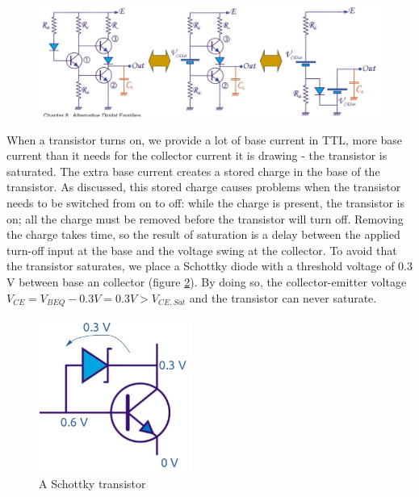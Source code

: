 \begin{figure}[h!]
	\centering
	\includegraphics[width=16cm]{figures/ch15/totem_low.jpg}
	\caption{}
	\label{fig:totem_low}
\end{figure}

When a transistor turns on, we provide a lot of base current in TTL, more base current than it needs for the collector current it is drawing - the transistor is saturated. The extra base current creates a stored charge in the base of the transistor. As discussed, this stored charge causes problems when the transistor needs to be switched from on to off: while the charge is present, the transistor is on; all the charge must be removed before the transistor will turn off. Removing the charge takes time, so the result of saturation is a delay between the applied turn-off input at the base and the voltage swing at the collector. To avoid that the transistor saturates, we place a Schottky diode with a threshold voltage of $0.3$ V between base an collector (figure \ref{fig:schottky_transistor}). By doing so, the collector-emitter voltage $V_{CE} = V_{BEQ} - 0.3V = 0.3V  > V_{CE, Sat}$ and the transistor can never saturate. 

\begin{figure}[h!]
	\centering
	\includegraphics[width=5cm]{figures/ch15/schottky_transistor.jpg}
	\caption{A Schottky transistor}
	\label{fig:schottky_transistor}
\end{figure}



